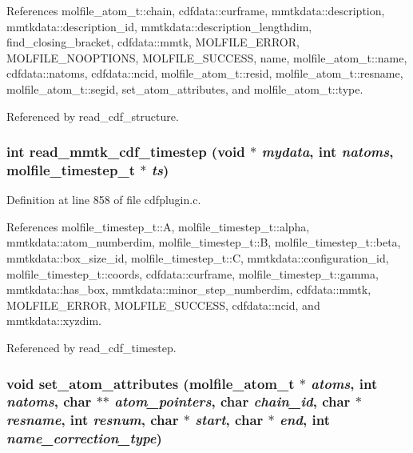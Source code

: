 References molfile\_\-atom\_\-t::chain, cdfdata::curframe, mmtkdata::description, mmtkdata::description\_\-id, mmtkdata::description\_\-lengthdim, find\_\-closing\_\-bracket, cdfdata::mmtk, MOLFILE\_\-ERROR, MOLFILE\_\-NOOPTIONS, MOLFILE\_\-SUCCESS, name, molfile\_\-atom\_\-t::name, cdfdata::natoms, cdfdata::ncid, molfile\_\-atom\_\-t::resid, molfile\_\-atom\_\-t::resname, molfile\_\-atom\_\-t::segid, set\_\-atom\_\-attributes, and molfile\_\-atom\_\-t::type.

Referenced by read\_\-cdf\_\-structure.
\subsubsection{\setlength{\rightskip}{0pt plus 5cm}int read\_\-mmtk\_\-cdf\_\-timestep (void $\ast$ {\em mydata}, int {\em natoms}, {\bf molfile\_\-timestep\_\-t} $\ast$ {\em ts})\hspace{0.3cm}{\tt  [static]}}\label{cdfplugin_8c_a15}




Definition at line 858 of file cdfplugin.c.

References molfile\_\-timestep\_\-t::A, molfile\_\-timestep\_\-t::alpha, mmtkdata::atom\_\-numberdim, molfile\_\-timestep\_\-t::B, molfile\_\-timestep\_\-t::beta, mmtkdata::box\_\-size\_\-id, molfile\_\-timestep\_\-t::C, mmtkdata::configuration\_\-id, molfile\_\-timestep\_\-t::coords, cdfdata::curframe, molfile\_\-timestep\_\-t::gamma, mmtkdata::has\_\-box, mmtkdata::minor\_\-step\_\-numberdim, cdfdata::mmtk, MOLFILE\_\-ERROR, MOLFILE\_\-SUCCESS, cdfdata::ncid, and mmtkdata::xyzdim.

Referenced by read\_\-cdf\_\-timestep.
\subsubsection{\setlength{\rightskip}{0pt plus 5cm}void set\_\-atom\_\-attributes ({\bf molfile\_\-atom\_\-t} $\ast$ {\em atoms}, int {\em natoms}, char $\ast$$\ast$ {\em atom\_\-pointers}, char {\em chain\_\-id}, char $\ast$ {\em resname}, int {\em resnum}, char $\ast$ {\em start}, char $\ast$ {\em end}, int {\em name\_\-correction\_\-type})\hspace{0.3cm}{\tt  [static]}}\label{cdfplugin_8c_a11}




